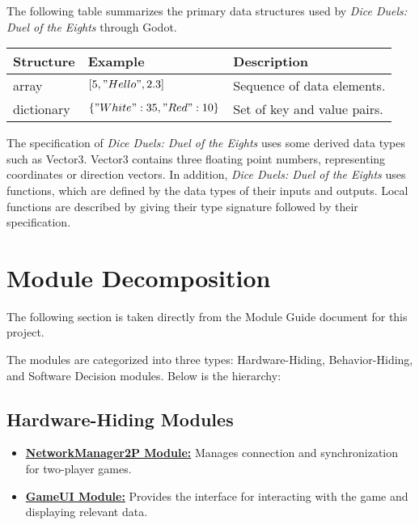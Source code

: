 \documentclass[12pt, titlepage]{article}
\begin{document}
The following table summarizes the primary data structures used by \textit{Dice Duels: Duel of the Eights} through Godot.

\begin{center}
\renewcommand{\arraystretch}{1.2}
\noindent 
\begin{tabular}{l l l} 
\toprule 
\textbf{Structure} & \textbf{Example} & \textbf{Description}\\ 
\midrule
array & $[5, "Hello", 2.3]$ & Sequence of data elements.\\
dictionary & $\{"White": 35, "Red": 10\}$ & Set of key and value pairs.\\
\bottomrule
\end{tabular} 
\end{center}

\noindent
The specification of \textit{Dice Duels: Duel of the Eights} uses some derived data types such as Vector3. Vector3 contains three floating point numbers, representing coordinates or direction vectors. In addition, \textit{Dice Duels: Duel of the Eights} uses functions, which are defined by the data types of their inputs and outputs. Local functions are described by giving their type signature followed by their specification.

\section{Module Decomposition}

The following section is taken directly from the Module Guide document for this project.

The modules are categorized into three types: Hardware-Hiding, Behavior-Hiding, and Software Decision modules. Below is the hierarchy:

\subsection{Hardware-Hiding Modules}
\begin{itemize}
    \item \hyperref[NetworkManager2P]{\textbf{NetworkManager2P Module:}} Manages connection and synchronization for two-player games.
    \item \hyperref[GameUI]{\textbf{GameUI Module:}} Provides the interface for interacting with the game and displaying relevant data.
\end{itemize}
\end{document}
